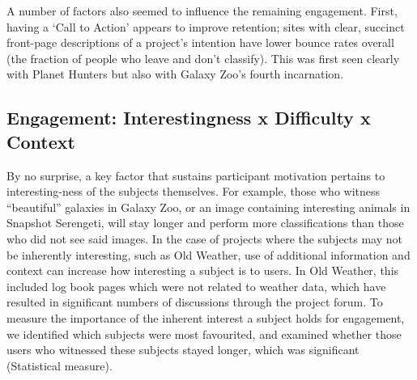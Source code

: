 \documentclass{sigchi}
\begin{document}


A number of factors also seemed to influence the remaining engagement.  First, having a `Call to Action' appears to improve retention; sites with clear, succinct front-page descriptions of a project's intention have lower bounce rates overall (the fraction of people who leave and don't classify). This was first seen clearly with Planet Hunters but also with Galaxy Zoo's fourth incarnation. %

\subsection{Engagement: Interestingness x Difficulty x Context}
By no surprise, a key factor that sustains participant motivation pertains to interesting-ness of the subjects themselves.  For example, those who witness ``beautiful'' galaxies in Galaxy Zoo, or an image containing interesting animals in Snapshot Serengeti, will stay longer and perform more classifications than those who did not see said images. In the case of projects where the subjects may not be inherently interesting, such as Old Weather, use of additional information and context can increase how interesting a subject is to users. In Old Weather, this included log book pages which were not related to weather data, which have resulted in significant numbers of discussions through the project forum.
To measure the importance of the inherent interest a subject holds for engagement, we identified which subjects were most favourited, and examined whether those users who witnessed these subjects stayed longer, which was significant (Statistical measure). %
\end{document}
